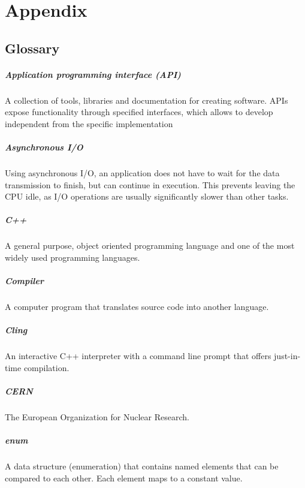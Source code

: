 \chapter{Appendix}
\section{Glossary}
\paragraph{Application programming interface (API)}
A collection of tools, libraries and documentation for creating software. APIs expose functionality through specified interfaces, which allows to develop independent from the specific implementation

\paragraph{Asynchronous I/O}
Using asynchronous I/O, an application does not have to wait for the data transmission to finish, but can continue in execution. This prevents leaving the CPU idle, as I/O operations are usually significantly slower than other tasks.

\paragraph{C++}
A general purpose, object oriented programming language and one of the most widely used programming languages.

\paragraph{Compiler}
A computer program that translates source code into another language.

\paragraph{Cling}
An interactive C++ interpreter with a command line prompt that offers just-in-time compilation.

\paragraph{CERN}
The European Organization for Nuclear Research.

\paragraph{enum}
A data structure (enumeration) that contains named elements that can be compared to each other. Each element maps to a constant value.

